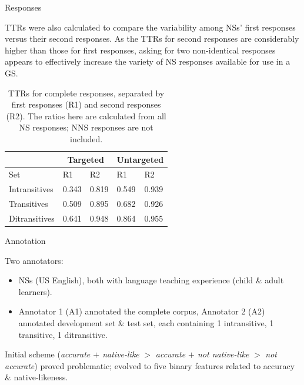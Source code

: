 \documentclass[final,t]{beamer}
\begin{document}
\begin{frame}{}
\begin{columns}[t]
\begin{column}{.33\linewidth}
\begin{block}{Responses}
\begin{center}
\begin{minipage}{.85\textwidth}
\vspace{1em}
TTRs were also calculated to compare the variability among NSs' first responses versus their second responses. As the TTRs for second responses are considerably higher than those for first responses, asking for two non-identical responses appears to effectively increase the variety of NS responses available for use in a GS.
\begin{table}[hb!]
\begin{center}
\begin{tabular}{|l||l|l||l|l|}
\hline
 & \multicolumn{2}{|c||}{Targeted} & \multicolumn{2}{|c|}{Untargeted} \\
\hline
 Set & R1 & R2 & R1 & R2 \\
\hline
\hline
Intransitives & 0.343 & 0.819 & 0.549 & 0.939 \\
\hline
Transitives & 0.509 & 0.895 & 0.682 & 0.926 \\ %
\hline
Ditransitives & 0.641 & 0.948 & 0.864 & 0.955  \\ 
\hline
\end{tabular}
\caption{\label{tab:ttr1v2} TTRs for complete responses, separated by first responses (R1) and second responses (R2). The ratios here are calculated from all NS responses; NNS responses are not included.}
\end{center}
\end{table}

\end{minipage}
\end{center}
\vspace{-.5em}
\end{block} 

\begin{block}{Annotation}
\begin{center}
\begin{minipage}{.85\textwidth}
Two annotators:
\begin{itemize}
	\item NSs (US English), both with language teaching experience (child \& adult learners).
	\item Annotator 1 (A1) annotated the complete corpus, Annotator 2 (A2) annotated development set \& test set, each containing 1 intransitive, 1 transitive, 1 ditransitive.
\end{itemize}
\vspace{1em}

Initial scheme (\textit{accurate $+$ native-like} $>$ \textit{accurate $+$ not native-like} $>$ \textit{not accurate}) proved problematic; evolved to five binary features related to accuracy \& native-likeness.


\end{minipage}
\end{center}
\end{block}
\end{column}
\end{columns}
\end{frame}
\end{document}
